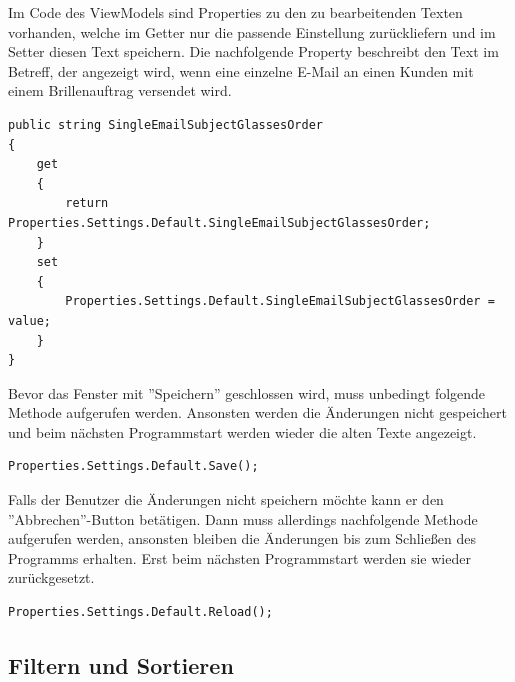 \newline Im Code des ViewModels sind Properties zu den zu bearbeitenden Texten vorhanden, welche im Getter nur die passende Einstellung zurückliefern und im Setter diesen Text speichern. \newline Die nachfolgende Property beschreibt den Text im Betreff, der angezeigt wird, wenn eine einzelne E-Mail an einen Kunden mit einem Brillenauftrag versendet wird. \newpage
\begin{lstlisting}
public string SingleEmailSubjectGlassesOrder 
{
	get 
	{ 
		return Properties.Settings.Default.SingleEmailSubjectGlassesOrder; 
	} 
	set 
	{ 
		Properties.Settings.Default.SingleEmailSubjectGlassesOrder = value; 
	} 
}
\end{lstlisting}
Bevor das Fenster mit ''Speichern'' geschlossen wird, muss unbedingt folgende Methode aufgerufen werden. Ansonsten werden die Änderungen nicht gespeichert und beim nächsten Programmstart werden wieder die alten Texte angezeigt.
\begin{lstlisting}
Properties.Settings.Default.Save();
\end{lstlisting}
Falls der Benutzer die Änderungen nicht speichern möchte kann er den ''Abbrechen''-Button betätigen. Dann muss allerdings nachfolgende Methode aufgerufen werden, ansonsten bleiben die Änderungen bis zum Schließen des Programms erhalten. Erst beim nächsten Programmstart werden sie wieder zurückgesetzt.
\begin{lstlisting}
Properties.Settings.Default.Reload();
\end{lstlisting}
\subsection{Filtern und Sortieren}
